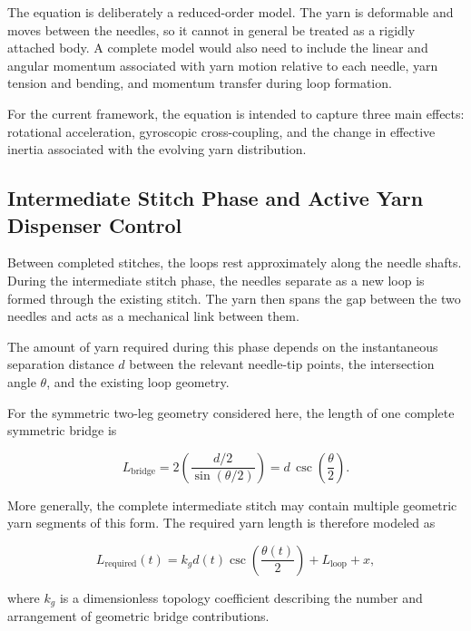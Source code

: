 \documentclass[12pt, a4paper]{article}
\begin{document}
The equation is deliberately a reduced-order model. The yarn is deformable and moves between the needles, so it cannot in general be treated as a rigidly attached body. A complete model would also need to include the linear and angular momentum associated with yarn motion relative to each needle, yarn tension and bending, and momentum transfer during loop formation.

For the current framework, the equation is intended to capture three main effects: rotational acceleration, gyroscopic cross-coupling, and the change in effective inertia associated with the evolving yarn distribution.

\subsection{Intermediate Stitch Phase and Active Yarn Dispenser Control}

Between completed stitches, the loops rest approximately along the needle shafts. During the intermediate stitch phase, the needles separate as a new loop is formed through the existing stitch. The yarn then spans the gap between the two needles and acts as a mechanical link between them.

The amount of yarn required during this phase depends on the instantaneous separation distance $d$ between the relevant needle-tip points, the intersection angle $\theta$, and the existing loop geometry.

For the symmetric two-leg geometry considered here, the length of one complete symmetric bridge is

\begin{equation}
L_{\text{bridge}}
=
2\left(
\frac{d/2}{\sin(\theta/2)}
\right)
=
d\,
\csc\left(\frac{\theta}{2}\right).
\end{equation}

More generally, the complete intermediate stitch may contain multiple geometric yarn segments of this form. The required yarn length is therefore modeled as

\begin{equation}
L_{\text{required}}(t)
=
k_g d(t)
\csc\left(\frac{\theta(t)}{2}\right)
+
L_{\text{loop}}
+
x,
\end{equation}

where $k_g$ is a dimensionless topology coefficient describing the number and arrangement of geometric bridge contributions.
\end{document}
